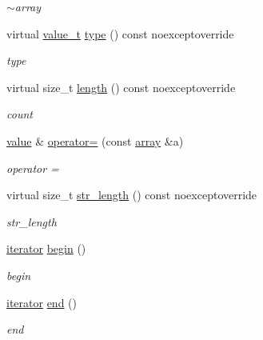 \begin{DoxyCompactItemize}
\begin{DoxyCompactList}\small\item\em $\sim$array \end{DoxyCompactList}\item 
virtual \hyperlink{classformat_1_1value_aa0334be06389a7b14af485fa0cd3aa21}{value\+\_\+t} \hyperlink{classformat_1_1array_a0fe16076f81ccc66e8208fe6dd4d2b1a}{type} () const noexceptoverride
\begin{DoxyCompactList}\small\item\em type \end{DoxyCompactList}\item 
virtual size\+\_\+t \hyperlink{classformat_1_1array_af15910f0535e266984f3f745efae5397}{length} () const noexceptoverride
\begin{DoxyCompactList}\small\item\em count \end{DoxyCompactList}\item 
\hyperlink{classformat_1_1value_aa6b85823936bf7b8ab78d3f8d443c00d}{value} \& \hyperlink{classformat_1_1array_a08ab9eaafc280dedec62b5b6f450164b}{operator=} (const \hyperlink{classformat_1_1array}{array} \&a)
\begin{DoxyCompactList}\small\item\em operator = \end{DoxyCompactList}\item 
virtual size\+\_\+t \hyperlink{classformat_1_1array_a579c320809545c627af0cbf9d8365080}{str\+\_\+length} () const noexceptoverride
\begin{DoxyCompactList}\small\item\em str\+\_\+length \end{DoxyCompactList}\item 
\hyperlink{classformat_1_1array_1_1iterator}{iterator} \hyperlink{classformat_1_1array_abbb0a5fbbcf3058b2eb34910e601aea0}{begin} ()
\begin{DoxyCompactList}\small\item\em begin \end{DoxyCompactList}\item 
\hyperlink{classformat_1_1array_1_1iterator}{iterator} \hyperlink{classformat_1_1array_aab3a5ba356998a7b15660f09ffd367ff}{end} ()
\begin{DoxyCompactList}\small\item\em end \end{DoxyCompactList}\end{DoxyCompactItemize}

